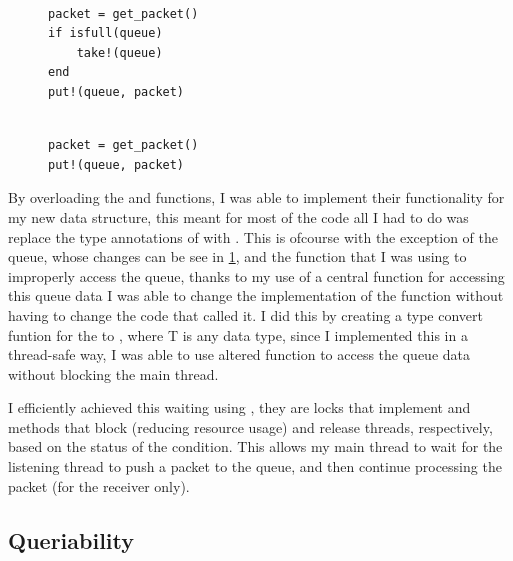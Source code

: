 \begin{figure}[!h]
    \begin{minipage}{0.5\textwidth}
        \centering
        \begin{verbatim}

packet = get_packet()
if isfull(queue)
    take!(queue)
end
put!(queue, packet)

        \end{verbatim}
    \end{minipage}
    \begin{minipage}{0.5\textwidth}
        \centering
        \begin{verbatim}

packet = get_packet()
put!(queue, packet)

        \end{verbatim}
    \end{minipage}
\label{lst:queue_comparison}
\end{figure}

By overloading the  and  functions, I was able to implement their functionality for my new data structure, this meant for most of the code all I had to do was replace the type annotations of  with . This is ofcourse with the exception of the queue, whose changes can be see in \ref{lst:queue_comparison}, and the  function that I was using to improperly access the queue, thanks to my use of a central function for accessing this queue data I was able to change the implementation of the function without having to change the code that called it. I did this by creating a type convert funtion for the  to , where T is any data type, since I implemented this in a thread-safe way, I was able to use altered  function to access the queue data without blocking the main thread.

I efficiently achieved this waiting using , they are locks that implement  and  methods that block (reducing resource usage) and release threads, respectively, based on the status of the condition. This allows my main thread to wait for the listening thread to push a packet to the queue, and then continue processing the packet (for the receiver only).

\subsection{Queriability}

